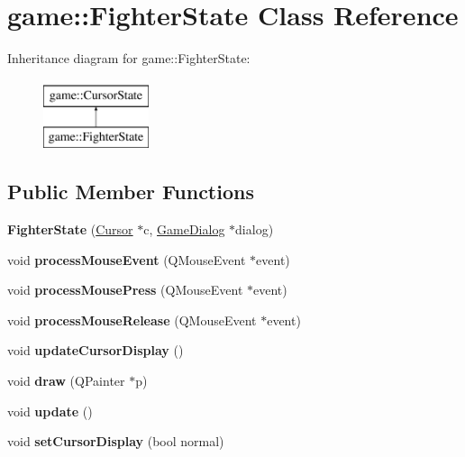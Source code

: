 \hypertarget{classgame_1_1FighterState}{}\section{game\+:\+:Fighter\+State Class Reference}
\label{classgame_1_1FighterState}
Inheritance diagram for game\+:\+:Fighter\+State\+:\begin{figure}[H]
\begin{center}
\leavevmode
\includegraphics[height=2.000000cm]{classgame_1_1FighterState}
\end{center}
\end{figure}
\subsection*{Public Member Functions}
\begin{DoxyCompactItemize}
\item 
\mbox{\label{classgame_1_1FighterState_ab1a6779b99bac5fd014668f2ea4b31b0}} 
{\bfseries Fighter\+State} (\hyperlink{classgame_1_1Cursor}{Cursor} $\ast$c, \hyperlink{classgame_1_1GameDialog}{Game\+Dialog} $\ast$dialog)
\item 
\mbox{\label{classgame_1_1FighterState_a3967e2a8cef2db564707b10ce65c01a0}} 
void {\bfseries process\+Mouse\+Event} (Q\+Mouse\+Event $\ast$event)
\item 
\mbox{\label{classgame_1_1FighterState_ae5450486db7312a2892b1e322ca88731}} 
void {\bfseries process\+Mouse\+Press} (Q\+Mouse\+Event $\ast$event)
\item 
\mbox{\label{classgame_1_1FighterState_acf3b706a0b2dac2a11da1e1aaa1b5ae6}} 
void {\bfseries process\+Mouse\+Release} (Q\+Mouse\+Event $\ast$event)
\item 
\mbox{\label{classgame_1_1FighterState_abdb968d67ac3918b3bec35ec3741561c}} 
void {\bfseries update\+Cursor\+Display} ()
\item 
\mbox{\label{classgame_1_1FighterState_aa4813a76f85bb36a4cd95eec6164cbbb}} 
void {\bfseries draw} (Q\+Painter $\ast$p)
\item 
\mbox{\label{classgame_1_1FighterState_a38ec7475a62daf8f71d9ee78eaf0e2d3}} 
void {\bfseries update} ()
\item 
\mbox{\label{classgame_1_1FighterState_a755235ed74c264900253a171d581ae1c}} 
void {\bfseries set\+Cursor\+Display} (bool normal)
\end{DoxyCompactItemize}
